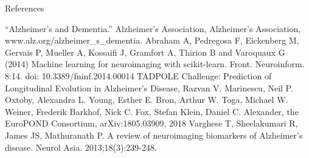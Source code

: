 \documentclass[final]{beamer}
\newlength{\onecolwid}
\begin{document}
\begin{frame}[t]
\begin{columns}[t]
\begin{column}{\onecolwid}
        
        
        \begin{block}{References}
        
        {
            
            \small
            \vspace{0.2in}
            \linebreak ``Alzheimer's and Dementia.'' Alzheimer's Association, Alzheimer's Association, www.alz.org/alzheimer\_s\_dementia.
            \linebreak
            \linebreak Abraham A, Pedregosa F, Eickenberg M, Gervais P, Mueller A, Kossaifi J, Gramfort A, Thirion B and Varoquaux G (2014) Machine learning for neuroimaging with scikit-learn. Front. Neuroinform. 8:14. doi: 10.3389/fninf.2014.00014
            \linebreak
            \linebreak TADPOLE Challenge: Prediction of Longitudinal Evolution in Alzheimer's Disease, Razvan V. Marinescu, Neil P. Oxtoby, Alexandra L. Young, Esther E. Bron, Arthur W. Toga, Michael W. Weiner, Frederik Barkhof, Nick C. Fox, Stefan Klein, Daniel C. Alexander, the EuroPOND Consortium, arXiv:1805.03909, 2018
            \linebreak
            \linebreak Varghese T, Sheelakumari R, James JS, Mathuranath P. A review of neuroimaging biomarkers of Alzheimer's disease. Neurol Asia. 2013;18(3):239-248.
            
           
            
        }
        
        \end{block}
        
        
        

\end{column}
\end{columns}
\end{frame}
\end{document}

